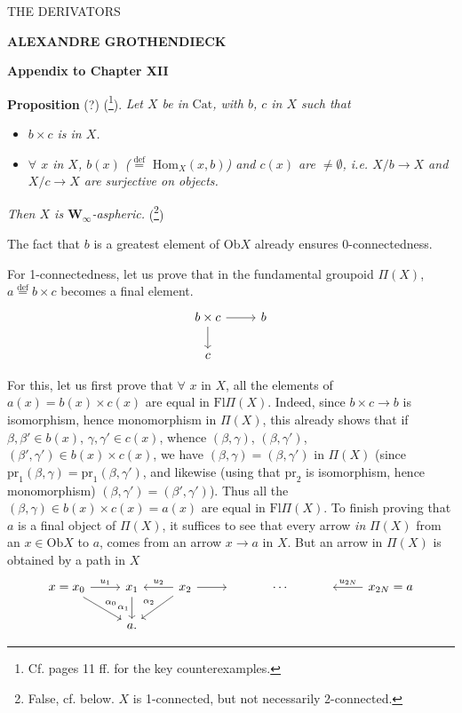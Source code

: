 \documentclass[11pt]{article}
\newcommand{\printedpage}[1]{\marginpar{\footnotesize p.~#1}}
\newcommand{\msp}[1]{\marginpar{\footnotesize [#1]}}
\newcommand{\Hom}{\mathrm{Hom}}
\newcommand{\Fl}{\mathrm{Fl}}
\newcommand{\Ob}{\mathrm{Ob}}
\newcommand{\Cat}{\mathrm{Cat}}
\newcommand{\pr}{\mathrm{pr}}
\newcommand{\deq}{\mathrel{\overset{\text{def}}{=}}}
\begin{document}
\printedpage{}

\begin{center}
{\LARGE\textsf{THE DERIVATORS}}

\bigskip

\textbf{ALEXANDRE GROTHENDIECK}

\bigskip\bigskip

{\large\textbf{Appendix to Chapter XII}}
\end{center}

\newpage

\printedpage{1}

\msp{page 1}
\textbf{Proposition} (?) (\footnote{Cf. pages 11 ff. for the key counterexamples.}). \textit{Let $X$ be in} $\Cat$\textit{, with $b$, $c$ in $X$ such that}

\begin{itemize}
\item[\textit{a)}] \textit{$b\times c$ is in $X$.}
\item[\textit{b)}] \textit{$\forall$ $x$ in $X$, $b(x)$ ($\deq$} $\Hom_X(x,b)$\textit{) and $c(x)$ are $\neq\emptyset$, i.e. $X/b \longrightarrow X$ and $X/c \longrightarrow X$ are surjective on objects.}
\end{itemize}

\textit{Then $X$ is $\mathbf{W}_\infty$-aspheric.} (\footnote{False, cf. below. $X$ is 1-connected, but not necessarily 2-connected.})

The fact that $b$ is a greatest element of $\Ob X$ already ensures 0-connectedness.

For 1-connectedness, let us prove that in the fundamental groupoid $\Pi(X)$, $a \deq b\times c$ becomes a final element.
\[
\begin{tikzcd}
b\times c \arrow[r] \arrow[d] & b \\
c &
\end{tikzcd}
\]

For this, let us first prove that $\forall$ $x$ in $X$, all the elements of $a(x) = b(x)\times c(x)$ are equal in $\Fl\Pi(X)$. Indeed, since $b\times c \longrightarrow b$ is isomorphism, hence monomorphism in $\Pi(X)$, this already shows that if $\beta,\beta'\in b(x)$, $\gamma,\gamma'\in c(x)$, whence $(\beta,\gamma)$, $(\beta,\gamma')$, $(\beta',\gamma')\in b(x)\times c(x)$, we have $(\beta,\gamma) = (\beta,\gamma')$ in $\Pi(X)$ (since $\pr_1(\beta,\gamma) = \pr_1(\beta,\gamma')$, and likewise (using that $\pr_2$ is isomorphism, hence monomorphism) $(\beta,\gamma') = (\beta',\gamma')$). Thus all the $(\beta,\gamma)\in b(x)\times c(x) = a(x)$ are equal in $\Fl\Pi(X)$. To finish proving that $a$ is a final object of $\Pi(X)$, it suffices to see that every arrow \textit{in} $\Pi(X)$ from an $x\in\Ob X$ to $a$, comes from an arrow $x\longrightarrow a$ in $X$. But an arrow in $\Pi(X)$ is obtained by a path in $X$
\[
\begin{tikzcd}
x = x_0 \arrow[r, "u_1"] \arrow[dr, "\alpha_0"] & x_1 \arrow[d, "\alpha_1"'] & x_2 \arrow[l, "u_2"'] \arrow[r] \arrow[dl, "\alpha_2"'] & {} & \cdots & {} & x_{2N} = a \arrow[l, "u_{2N}"'] \\
& a. & & & & &
\end{tikzcd}
\]
\end{document}
